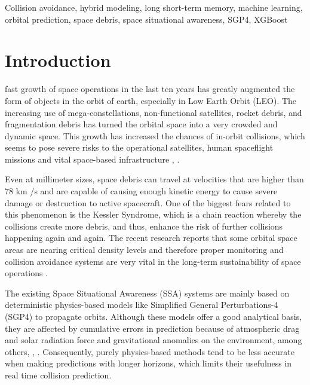 \documentclass{ieeeaccess}
\begin{document}
\begin{keywords}
Collision avoidance, hybrid modeling, long short-term memory, machine learning, orbital prediction, space debris, space situational awareness, SGP4, XGBoost
\end{keywords}

\titlepgskip=-15pt

\maketitle

\section{Introduction}
\label{sec:introduction}
 fast growth of space operations in the last ten years has greatly augmented the form of objects in the orbit of earth, especially in Low Earth Orbit (LEO). The increasing use of mega-constellations, non-functional satellites, rocket debris, and fragmentation debris has turned the orbital space into a very crowded and dynamic space. This growth has increased the chances of in-orbit collisions, which seems to pose severe risks to the operational satellites, human spaceflight missions and vital space-based infrastructure \cite{b2}, \cite{b25}.

Even at millimeter sizes, space debris can travel at velocities that are higher than 78 km /s and are capable of causing enough kinetic energy to cause severe damage or destruction to active spacecraft. One of the biggest fears related to this phenomenon is the Kessler Syndrome, which is a chain reaction whereby the collisions create more debris, and thus, enhance the risk of further collisions happening again and again. The recent research reports that some orbital space areas are nearing critical density levels and therefore proper monitoring and collision avoidance systems are very vital in the long-term sustainability of space operations \cite{b2}.

The existing Space Situational Awareness (SSA) systems are mainly based on deterministic physics-based models like Simplified General Perturbations-4 (SGP4) to propagate orbits. Although these models offer a good analytical basis, they are affected by cumulative errors in prediction because of atmospheric drag and solar radiation force and gravitational anomalies on the environment, among others, \cite{b4}, \cite{b5}. Consequently, purely physics-based methods tend to be less accurate when making predictions with longer horizons, which limits their usefulness in real time collision prediction.
\end{document}
